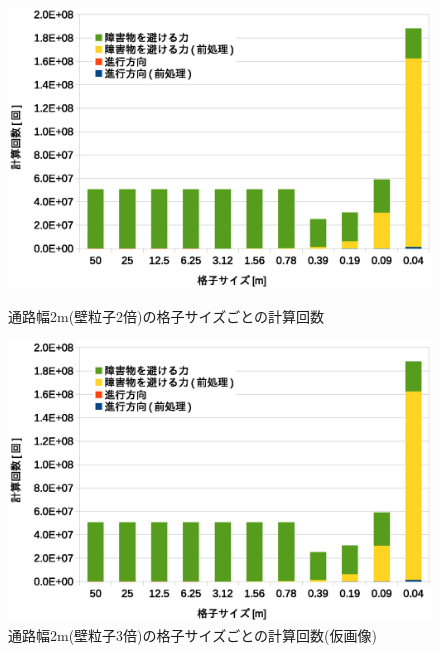 \begin{figure}[tb]
	\begin{minipage}[b]{0.48\columnwidth}
		\begin{center}
		\includegraphics[width=\columnwidth]{figure/5_result_2bai_times.eps}
		\caption{通路幅2m(壁粒子2倍)の格子サイズごとの計算回数}
		\label{fig:result_2bai_times}
		\end{center}
	\end{minipage}
	\hspace{0.04\columnwidth}
	\begin{minipage}[b]{0.48\columnwidth}
		\begin{center}
		\includegraphics[width=\columnwidth]{figure/5_result_2bai_times.eps}
		\caption{通路幅2m(壁粒子3倍)の格子サイズごとの計算回数(仮画像)}
		\label{fig:result_3bai_times}
		\end{center}
	\end{minipage}
\end{figure}
